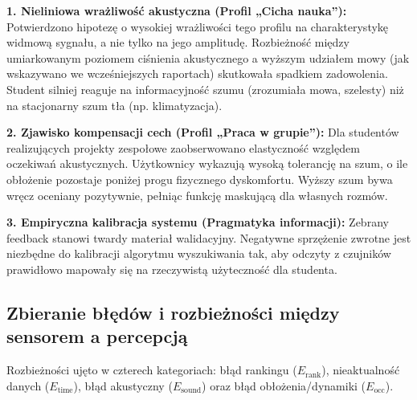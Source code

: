 \documentclass[14pt,a4paper]{extarticle}
\begin{document}
\textbf{1. Nieliniowa wrażliwość akustyczna (Profil „Cicha nauka”):}
Potwierdzono hipotezę o wysokiej wrażliwości tego profilu na charakterystykę widmową sygnału, a nie tylko na jego amplitudę. Rozbieżność między umiarkowanym poziomem ciśnienia akustycznego a wyższym udziałem mowy (jak wskazywano we wcześniejszych raportach) skutkowała spadkiem zadowolenia. Student silniej reaguje na informacyjność szumu (zrozumiała mowa, szelesty) niż na stacjonarny szum tła (np. klimatyzacja).

\textbf{2. Zjawisko kompensacji cech (Profil „Praca w grupie”):}
Dla studentów realizujących projekty zespołowe zaobserwowano elastyczność względem oczekiwań akustycznych. Użytkownicy wykazują wysoką tolerancję na szum, o ile obłożenie pozostaje poniżej progu fizycznego dyskomfortu. Wyższy szum bywa wręcz oceniany pozytywnie, pełniąc funkcję maskującą dla własnych rozmów.

\textbf{3. Empiryczna kalibracja systemu (Pragmatyka informacji):}
Zebrany feedback stanowi twardy materiał walidacyjny. Negatywne sprzężenie zwrotne jest niezbędne do kalibracji algorytmu wyszukiwania tak, aby odczyty z czujników prawidłowo mapowały się na rzeczywistą użyteczność dla studenta.

\subsection{Zbieranie błędów i rozbieżności między sensorem a percepcją}
Rozbieżności ujęto w czterech kategoriach: błąd rankingu ($E_{\text{rank}}$), nieaktualność danych ($E_{\text{time}}$), błąd akustyczny ($E_{\text{sound}}$) oraz błąd obłożenia/dynamiki ($E_{\text{occ}}$).

\begin{table}[H]
    \centering
    \caption{Klasyfikacja dominującej przyczyny niezadowolenia (sesje z feedbackiem ,,Nie'').}
    \label{tab:rozbieznosci}
\end{table}
\end{document}
